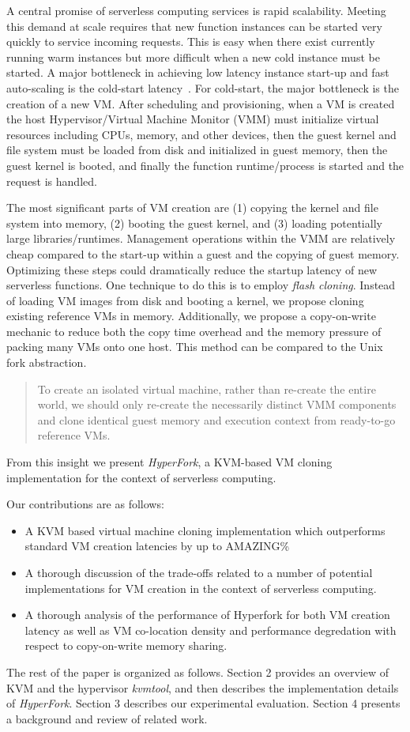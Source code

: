  A central promise of
serverless computing services is rapid scalability. Meeting this demand at
scale requires that new function instances can be started very quickly to
service incoming requests. This is easy when there exist currently running
warm instances but more difficult when a new cold instance must
be started. A major bottleneck in achieving low latency instance start-up and
fast auto-scaling is the cold-start latency~\cite{peeking}. For cold-start, the
major bottleneck is the creation of a new VM. After scheduling and
provisioning, when a VM is created the host Hypervisor/Virtual Machine Monitor
(VMM) must initialize virtual resources including CPUs, memory, and other
devices, then the guest kernel and file system must be loaded from disk and
initialized in guest memory, then the guest kernel is booted, and finally the
function runtime/process is started and the request is handled.

 The most significant parts of VM creation are (1)
copying the kernel and file system into memory, (2) booting the guest kernel,
and (3) loading potentially large libraries/runtimes. Management operations
within the VMM are relatively cheap compared to the start-up within a guest and
the copying of guest memory. Optimizing these steps could dramatically reduce
the startup latency of new serverless functions. One technique to do this is to
employ \emph{flash cloning}. Instead of loading VM images from disk and booting
a kernel, we propose cloning existing reference VMs in memory. Additionally, we
propose a copy-on-write mechanic to reduce both the copy time overhead and the
memory pressure of packing many VMs onto one host. This method can be compared
to the Unix fork abstraction.


\begin{quote} To create an isolated virtual machine, rather than re-create the
entire world, we should only re-create the necessarily distinct VMM components
and clone identical guest memory and execution context from ready-to-go
reference VMs.
\end{quote}

From this insight we present \emph{HyperFork}, a KVM-based VM cloning
implementation for the context of serverless computing.

 Our contributions are as follows: \begin{itemize}
\item A KVM based virtual machine cloning implementation which outperforms
standard VM creation latencies by up to AMAZING\%
\item A thorough discussion of the trade-offs related to a number of potential
implementations for VM creation in the context of serverless computing.
\item A thorough analysis of the performance of Hyperfork for both VM creation
latency as well as VM co-location density and performance degredation with
respect to copy-on-write memory sharing.
\end{itemize}

The rest of the paper is organized as follows. Section 2 provides an overview of KVM and the hypervisor \emph{kvmtool}, and then describes the implementation details of \emph{HyperFork}. Section 3 describes our experimental evaluation. Section 4 presents a background and review of related work.
